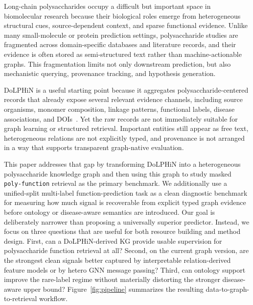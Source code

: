 \documentclass[11pt]{article}
\begin{document}
Long-chain polysaccharides occupy a difficult but important space in biomolecular research because their biological roles emerge from heterogeneous structural cues, source-dependent context, and sparse functional evidence. Unlike many small-molecule or protein prediction settings, polysaccharide studies are fragmented across domain-specific databases and literature records, and their evidence is often stored as semi-structured text rather than machine-actionable graphs. This fragmentation limits not only downstream prediction, but also mechanistic querying, provenance tracking, and hypothesis generation.

DoLPHiN is a useful starting point because it aggregates polysaccharide-centered records that already expose several relevant evidence channels, including source organisms, monomer composition, linkage patterns, functional labels, disease associations, and DOIs~\cite{xin2025dolphin}. Yet the raw records are not immediately suitable for graph learning or structured retrieval. Important entities still appear as free text, heterogeneous relations are not explicitly typed, and provenance is not arranged in a way that supports transparent graph-native evaluation.

This paper addresses that gap by transforming DoLPHiN into a heterogeneous polysaccharide knowledge graph and then using this graph to study masked \texttt{poly-function} retrieval as the primary benchmark. We additionally use a unified-split multi-label function-prediction task as a clean diagnostic benchmark for measuring how much signal is recoverable from explicit typed graph evidence before ontology or disease-aware semantics are introduced. Our goal is deliberately narrower than proposing a universally superior predictor. Instead, we focus on three questions that are useful for both resource building and method design. First, can a DoLPHiN-derived KG provide usable supervision for polysaccharide function retrieval at all? Second, on the current graph version, are the strongest clean signals better captured by interpretable relation-derived feature models or by hetero GNN message passing? Third, can ontology support improve the rare-label regime without materially distorting the stronger disease-aware upper bound? Figure~\ref{fig:pipeline} summarizes the resulting data-to-graph-to-retrieval workflow.
\end{document}
